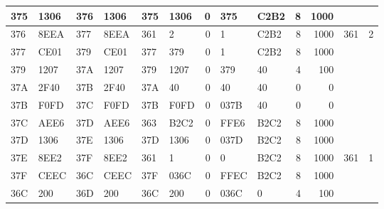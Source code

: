 \begin{center}
\begin{tabular}{|l|l|l|l|l|l|r|l|l|r|r|l|l|}
        \hline
        375          & 1306          & 376         & 1306        & 375         & 1306        & 0           & 375         & C2B2        & 8           & 1000          &              &               \\
        \hline
        376          & 8EEA          & 377         & 8EEA        & 361         & 2           & 0           & 1           & C2B2        & 8           & 1000          & 361          & 2             \\
        \hline
        377          & CE01          & 379         & CE01        & 377         & 379         & 0           & 1           & C2B2        & 8           & 1000          &              &               \\
        \hline
        379          & 1207          & 37A         & 1207        & 379         & 1207        & 0           & 379         & 40          & 4           & 100           &              &               \\
        \hline
        37A          & 2F40          & 37B         & 2F40        & 37A         & 40          & 0           & 40          & 40          & 0           & 0             &              &               \\
        \hline
        37B          & F0FD          & 37C         & F0FD        & 37B         & F0FD        & 0           & 037B        & 40          & 0           & 0             &              &               \\
        \hline
        37C          & AEE6          & 37D         & AEE6        & 363         & B2C2        & 0           & FFE6        & B2C2        & 8           & 1000          &              &               \\
        \hline
        37D          & 1306          & 37E         & 1306        & 37D         & 1306        & 0           & 037D        & B2C2        & 8           & 1000          &              &               \\
        \hline
        37E          & 8EE2          & 37F         & 8EE2        & 361         & 1           & 0           & 0           & B2C2        & 8           & 1000          & 361          & 1             \\
        \hline
        37F          & CEEC          & 36C         & CEEC        & 37F         & 036C        & 0           & FFEC        & B2C2        & 8           & 1000          &              &               \\
        \hline
        36C          & 200           & 36D         & 200         & 36C         & 200         & 0           & 036C        & 0           & 4           & 100           &              &               \\

\end{tabular}
\end{center}
